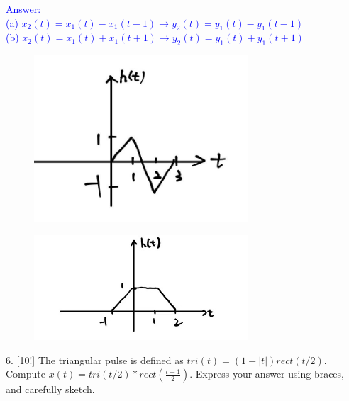 \documentclass[12pt,a4paper]{article}
\begin{document}
\begin{tcolorbox}
\normalsize
\textcolor{blue}{Answer:\\
(a) $x_2(t)=x_1(t)-x_1(t-1)\rightarrow y_2(t)=y_1(t)-y_1(t-1)$\\
(b) $x_2(t)=x_1(t)+x_1(t+1)\rightarrow y_2(t)=y_1(t)+y_1(t+1)$
\begin{figure}[H]
    \centering
    \includegraphics[width=8cm]{51.jpg}
\end{figure}
\begin{figure}[H]
    \centering
    \includegraphics[width=8cm]{52.jpg}
\end{figure}}
\end{tcolorbox}

\begin{tcolorbox}[colback = white]
6. [10!] The triangular pulse is defined as $tri(t)=(1-|t|)rect(t/2)$. Compute $x(t)=tri(t/2)*rect(\frac{t-1}{2})$. Express your answer using braces, and carefully sketch.

\end{tcolorbox}
\end{document}
